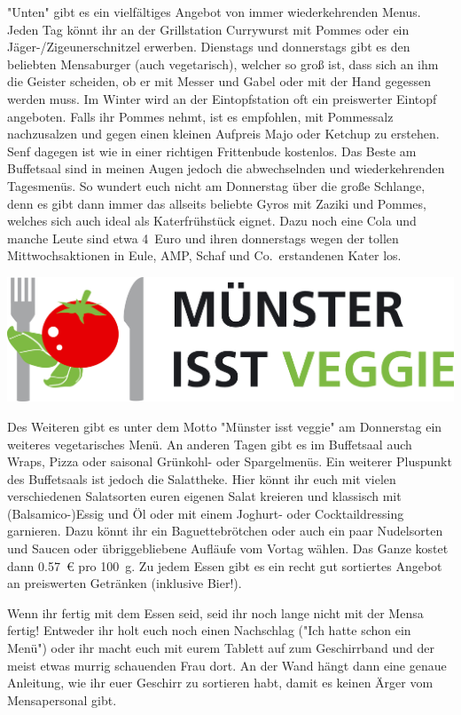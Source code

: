 \begin{multicols*}{2}
"Unten" gibt es ein vielfältiges Angebot von immer wiederkehrenden Menus. Jeden Tag könnt ihr an der Grillstation Currywurst mit Pommes oder ein Jäger-/Zigeunerschnitzel erwerben. Dienstags und donnerstags gibt es den beliebten Mensaburger (auch vegetarisch), welcher so groß ist, dass sich an ihm die Geister scheiden, ob er mit Messer und Gabel oder mit der Hand gegessen werden muss. Im Winter wird an der Eintopfstation oft ein preiswerter Eintopf angeboten. Falls ihr Pommes nehmt, ist es empfohlen, mit Pommessalz nachzusalzen und gegen einen kleinen Aufpreis Majo oder Ketchup zu erstehen. Senf dagegen ist wie in einer richtigen Frittenbude kostenlos. Das Beste am Buffetsaal sind in meinen Augen jedoch die abwechselnden und wiederkehrenden Tagesmenüs. So wundert euch nicht am Donnerstag über die große Schlange, denn es gibt dann immer das allseits beliebte Gyros mit Zaziki und Pommes, welches sich auch ideal als Katerfrühstück eignet. Dazu noch eine Cola und manche Leute sind etwa 4~Euro und ihren donnerstags wegen der tollen Mittwochsaktionen in Eule, AMP, Schaf und Co.\ erstandenen Kater los.

\includegraphics[width=\columnwidth]{res/muenster_isst_veggie.png}

Des Weiteren gibt es unter dem Motto "Münster isst veggie" am Donnerstag ein weiteres vegetarisches Menü. An anderen Tagen gibt es im Buffetsaal auch Wraps, Pizza oder saisonal Grünkohl- oder Spargelmenüs. Ein weiterer Pluspunkt des Buffetsaals ist jedoch die Salattheke. Hier könnt ihr euch mit vielen verschiedenen Salatsorten euren eigenen Salat kreieren und klassisch mit (Balsamico-)Essig und Öl oder mit einem Joghurt- oder Cocktaildressing garnieren. Dazu könnt ihr ein Baguettebrötchen oder auch ein paar Nudelsorten und Saucen oder übriggebliebene Aufläufe vom Vortag wählen. Das Ganze kostet dann \SI{0,57}{\euro} pro \SI{100}{\g}. Zu jedem Essen gibt es ein recht gut sortiertes Angebot an preiswerten Getränken (inklusive Bier!).

Wenn ihr fertig mit dem Essen seid, seid ihr noch lange nicht mit der Mensa fertig! Entweder ihr holt euch noch einen Nachschlag ("Ich hatte schon ein Menü") oder ihr macht euch mit eurem Tablett auf zum Geschirrband und der meist etwas murrig schauenden Frau dort. An der Wand hängt dann eine genaue Anleitung, wie ihr euer Geschirr zu sortieren habt, damit es keinen Ärger vom Mensapersonal gibt.


\end{multicols*}
